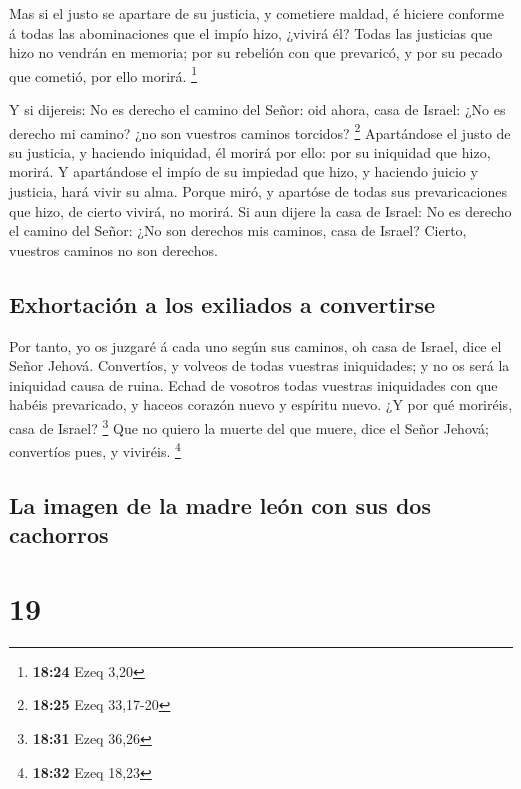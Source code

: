  Mas si el justo se apartare de su justicia, y cometiere
maldad, é hiciere conforme á todas las abominaciones que el impío hizo,
¿vivirá él? Todas las justicias que hizo no vendrán en memoria; por su
rebelión con que prevaricó, y por su pecado que cometió, por ello
morirá. \footnote{\textbf{18:24} Ezeq 3,20}

 Y si dijereis: No es derecho el camino del Señor: oid
ahora, casa de Israel: ¿No es derecho mi camino? ¿no son vuestros
caminos torcidos? \footnote{\textbf{18:25} Ezeq 33,17-20} 
Apartándose el justo de su justicia, y haciendo iniquidad, él morirá por
ello: por su iniquidad que hizo, morirá.  Y apartándose el
impío de su impiedad que hizo, y haciendo juicio y justicia, hará vivir
su alma.  Porque miró, y apartóse de todas sus
prevaricaciones que hizo, de cierto vivirá, no morirá.  Si
aun dijere la casa de Israel: No es derecho el camino del Señor: ¿No son
derechos mis caminos, casa de Israel? Cierto, vuestros caminos no son
derechos.

\hypertarget{exhortaciuxf3n-a-los-exiliados-a-convertirse}{%
\subsection{Exhortación a los exiliados a
convertirse}\label{exhortaciuxf3n-a-los-exiliados-a-convertirse}}

 Por tanto, yo os juzgaré á cada uno según sus caminos, oh
casa de Israel, dice el Señor Jehová. Convertíos, y volveos de todas
vuestras iniquidades; y no os será la iniquidad causa de ruina.
 Echad de vosotros todas vuestras iniquidades con que
habéis prevaricado, y haceos corazón nuevo y espíritu nuevo. ¿Y por qué
moriréis, casa de Israel? \footnote{\textbf{18:31} Ezeq 36,26}
 Que no quiero la muerte del que muere, dice el Señor
Jehová; convertíos pues, y viviréis. \footnote{\textbf{18:32} Ezeq 18,23}

\hypertarget{la-imagen-de-la-madre-leuxf3n-con-sus-dos-cachorros}{%
\subsection{La imagen de la madre león con sus dos
cachorros}\label{la-imagen-de-la-madre-leuxf3n-con-sus-dos-cachorros}}

\hypertarget{section-18}{%
\section{19}\label{section-18}}

